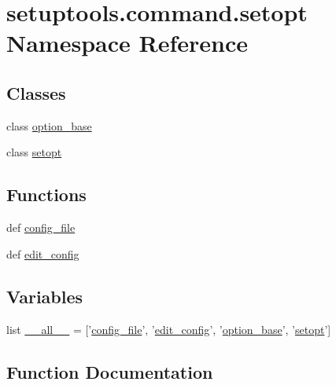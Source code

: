\hypertarget{namespacesetuptools_1_1command_1_1setopt}{}\section{setuptools.\+command.\+setopt Namespace Reference}
\label{namespacesetuptools_1_1command_1_1setopt}
\subsection*{Classes}
\begin{DoxyCompactItemize}
\item 
class \hyperlink{classsetuptools_1_1command_1_1setopt_1_1option__base}{option\+\_\+base}
\item 
class \hyperlink{classsetuptools_1_1command_1_1setopt_1_1setopt}{setopt}
\end{DoxyCompactItemize}
\subsection*{Functions}
\begin{DoxyCompactItemize}
\item 
def \hyperlink{namespacesetuptools_1_1command_1_1setopt_a568fbf500763604efda883738c623f91}{config\+\_\+file}
\item 
def \hyperlink{namespacesetuptools_1_1command_1_1setopt_a59cd7ab3699d818c294a3477c609cf3b}{edit\+\_\+config}
\end{DoxyCompactItemize}
\subsection*{Variables}
\begin{DoxyCompactItemize}
\item 
list \hyperlink{namespacesetuptools_1_1command_1_1setopt_a3cf4762e8e8fb05dbb87ac63f822f9da}{\+\_\+\+\_\+all\+\_\+\+\_\+} = \mbox{[}'\hyperlink{namespacesetuptools_1_1command_1_1setopt_a568fbf500763604efda883738c623f91}{config\+\_\+file}', '\hyperlink{namespacesetuptools_1_1command_1_1setopt_a59cd7ab3699d818c294a3477c609cf3b}{edit\+\_\+config}', '\hyperlink{classsetuptools_1_1command_1_1setopt_1_1option__base}{option\+\_\+base}', '\hyperlink{classsetuptools_1_1command_1_1setopt_1_1setopt}{setopt}'\mbox{]}
\end{DoxyCompactItemize}


\subsection{Function Documentation}
\hypertarget{namespacesetuptools_1_1command_1_1setopt_a568fbf500763604efda883738c623f91}{}
